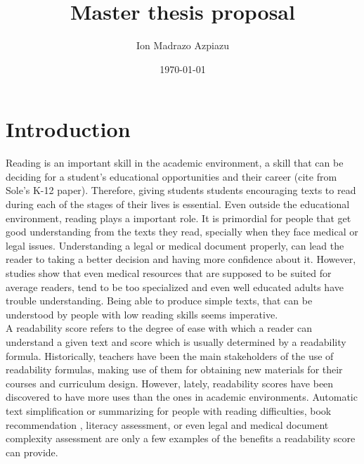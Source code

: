 \documentclass[12pt]{article}
\title{Master thesis proposal}
\author{Ion Madrazo Azpiazu}
\date{\today}
\begin{document}
\maketitle
\section{Introduction}

Reading is an important skill in the academic environment, a skill that can be deciding for a student's educational opportunities and their career {\color{red}(cite from Sole's K-12 paper)}. Therefore, giving students students encouraging texts to read during each of the stages of their lives is essential. Even outside the educational environment, reading plays a important role. It is primordial for people that get good understanding from the texts they read, specially when they face medical or legal issues. Understanding a legal or medical document properly, can lead the reader to taking a better decision and having more confidence about  it. However, studies\cite{medicalReadability1}\cite{medicalReadability2}\cite{medicalReadability3} show that even medical resources that are supposed to be suited for average readers, tend to be too specialized and even well educated adults have trouble understanding. Being able to produce simple texts, that can be understood by people with low reading skills seems imperative.\\



A readability score refers to the degree of ease with which a reader can understand a given text and score which is usually determined by a readability formula. Historically, teachers have been the main stakeholders of the use of readability formulas, making use of them for obtaining new materials for their courses and curriculum design. However, lately, readability scores have been discovered to have more uses than the ones in academic environments. Automatic text simplification\cite{textsimplification1}\cite{textsimplification2} or summarizing for people with reading difficulties\cite{textsimplificationWithDisabilities1}, book recommendation \cite{pera2014automating}, literacy assessment\cite{literacy1}, or even legal\cite{legalreadability} and medical document complexity assessment\cite{medicalReadability1}\cite{medicalReadability2}\cite{medicalReadability3} are only a few examples of the benefits a readability score can provide.\\
\end{document}
